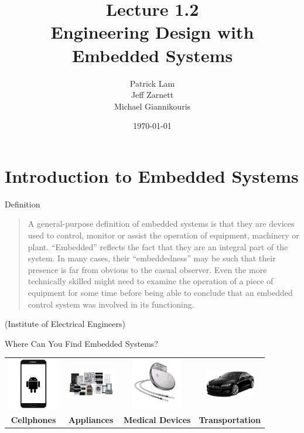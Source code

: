 \documentclass{beamer}
\title{Lecture 1.2 \\ Engineering Design with Embedded Systems}
\date{\today}
\author{Patrick Lam \\ Jeff Zarnett \\ Michael Giannikouris}
\institute{Department of Electrical and Computer Engineering}
\begin{document}
\maketitle

\section{Introduction to Embedded Systems}
	
	\begin{frame}{Definition}

		\begin{center}
			\begin{quote}
				A general-purpose definition of embedded systems is that they are
				devices used to control, monitor or assist the operation of equipment,
				machinery or plant. “Embedded” reflects the fact that they are an
				integral part of the system. In many cases, their “embeddedness” may
				be such that their presence is far from obvious to the casual observer.
				Even the more technically skilled might need to examine the operation
				of a piece of equipment for some time before being able to conclude
				that an embedded control system was involved in its functioning.
			\end{quote}
		\end{center}
		
		\begin{flushright}			
			(Institute of Electrical Engineers)
		\end{flushright}	
		
	\end{frame}  
	
	\begin{frame}{Where Can You Find Embedded Systems?}
		\begin{tabular}{c c c c}		
			\includegraphics[width=6em]{img/phone-icon-android-phone.png} &
			\includegraphics[width=6em]{img/appliances.png} &
			\includegraphics[width=6em]{img/Permanent-Pacemaker.png} &
			\includegraphics[width=6em]{img/must_diagonaal1.png} \\
			\tiny{\textbf{Cellphones}} &
			\tiny{\textbf{Appliances}} &
			\tiny{\textbf{Medical Devices}} &
			\tiny{\textbf{Transportation}}
		\end{tabular}
	\end{frame}
	
\end{document}
